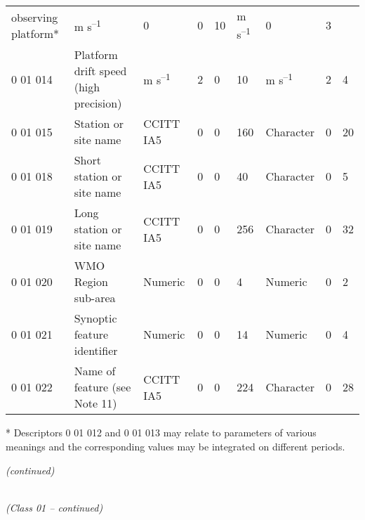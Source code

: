 \begin{longtable}[]{@{}lllllllll@{}}
\begin{minipage}[t]{0.08\columnwidth}
observing platform*\strut
\end{minipage} & \begin{minipage}[t]{0.08\columnwidth}\raggedright
m s\textsuperscript{--1}\strut
\end{minipage} & \begin{minipage}[t]{0.08\columnwidth}\raggedright
0\strut
\end{minipage} & \begin{minipage}[t]{0.08\columnwidth}\raggedright
0\strut
\end{minipage} & \begin{minipage}[t]{0.08\columnwidth}\raggedright
10\strut
\end{minipage} & \begin{minipage}[t]{0.08\columnwidth}\raggedright
m s\textsuperscript{--1}\strut
\end{minipage} & \begin{minipage}[t]{0.08\columnwidth}\raggedright
0\strut
\end{minipage} & \begin{minipage}[t]{0.08\columnwidth}\raggedright
3\strut
\end{minipage}\tabularnewline
0 01 014 & Platform drift speed (high precision) & m s\textsuperscript{--1} & 2 & 0 & 10 & m s\textsuperscript{--1} & 2 & 4\tabularnewline
0 01 015 & Station or site name & CCITT IA5 & 0 & 0 & 160 & Character & 0 & 20\tabularnewline
0 01 018 & Short station or site name & CCITT IA5 & 0 & 0 & 40 & Character & 0 & 5\tabularnewline
0 01 019 & Long station or site name & CCITT IA5 & 0 & 0 & 256 & Character & 0 & 32\tabularnewline
0 01 020 & WMO Region sub-area & Numeric & 0 & 0 & 4 & Numeric & 0 & 2\tabularnewline
0 01 021 & Synoptic feature identifier & Numeric & 0 & 0 & 14 & Numeric & 0 & 4\tabularnewline
0 01 022 & Name of feature (see Note 11) & CCITT IA5 & 0 & 0 & 224 & Character & 0 & 28\tabularnewline
\bottomrule
\end{longtable}

* Descriptors 0 01 012 and 0 01 013 may relate to parameters of various meanings and the corresponding values may be integrated on different periods.

\emph{(continued)}

\emph{\\
(Class 01 -- continued)}

